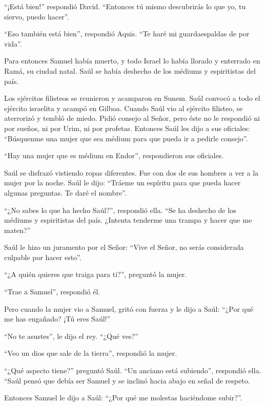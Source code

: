  ``¡Está bien!'' respondió David. ``Entonces tú mismo
descubrirás lo que yo, tu siervo, puedo hacer''.

``Eso también está bien'', respondió Aquis. ``Te haré mi guardaespaldas
de por vida''.

 Para entonces Samuel había muerto, y todo Israel lo había
llorado y enterrado en Ramá, su ciudad natal. Saúl se había deshecho de
los médiums y espiritistas del país.

 Los ejércitos filisteos se reunieron y acamparon en Sunem.
Saúl convocó a todo el ejército israelita y acampó en Gilboa.
 Cuando Saúl vio al ejército filisteo, se aterrorizó y
tembló de miedo.  Pidió consejo al Señor, pero éste no le
respondió ni por sueños, ni por Urim, ni por profetas. 
Entonces Saúl les dijo a sus oficiales: ``Búsquenme una mujer que sea
médium para que pueda ir a pedirle consejo''.

``Hay una mujer que es médium en Endor'', respondieron sus oficiales.

 Saúl se disfrazó vistiendo ropas diferentes. Fue con dos de
sus hombres a ver a la mujer por la noche. Saúl le dijo: ``Tráeme un
espíritu para que pueda hacer algunas preguntas. Te daré el nombre''.

 ``¿No sabes lo que ha hecho Saúl?'', respondió ella. ``Se
ha deshecho de los médiums y espiritistas del país. ¿Intenta tenderme
una trampa y hacer que me maten?''

 Saúl le hizo un juramento por el Señor: ``Vive el Señor,
no serás considerada culpable por hacer esto''.

 ``¿A quién quieres que traiga para ti?'', preguntó la
mujer.

``Trae a Samuel'', respondió él.

 Pero cuando la mujer vio a Samuel, gritó con fuerza y le
dijo a Saúl: ``¿Por qué me has engañado? ¡Tú eres Saúl!''

 ``No te asustes'', le dijo el rey. ``¿Qué ves?''

``Veo un dios que sale de la tierra'', respondió la mujer.

 ``¿Qué aspecto tiene?'' preguntó Saúl. ``Un anciano está
subiendo'', respondió ella. ``Saúl pensó que debía ser Samuel y se
inclinó hacia abajo en señal de respeto.

 Entonces Samuel le dijo a Saúl: ``¿Por qué me molestas
haciéndome subir?''.

